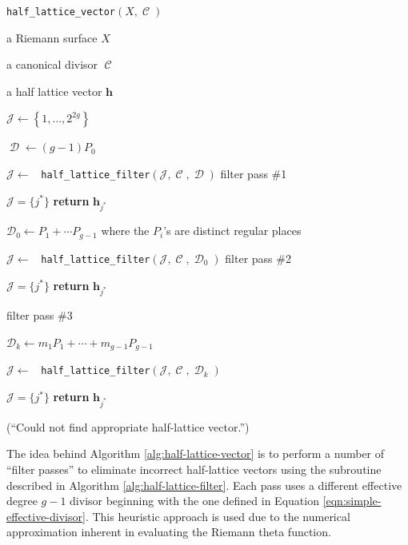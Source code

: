 \documentclass[12pt]{article}
\theoremstyle{definition}
\DeclareMathOperator{\DivC}{\mathcal{C}}
\DeclareMathOperator{\DivD}{\mathcal{D}}
\begin{document}
\begin{algorithm}[t]
\caption{{\tt half\_lattice\_vector}$(X,\DivC)$}
\label{alg:half-lattice-vector}
\begin{algorithmic}[1]

\Require a Riemann surface $X$

\Require a canonical divisor $\DivC$

\Ensure a half lattice vector $\boldsymbol{h}$

\State $\mathcal{J} \gets \left\{ 1, \ldots, 2^{2g} \right\}$

\State $\DivD \gets (g-1)P_0$

\State $\mathcal{J} \gets$ {\tt
  half\_lattice\_filter}$(\mathcal{J},\DivC,\DivD)$ \Comment filter pass \#1

 $\mathcal{J} = \{j^*\}$ {\bf return} $\boldsymbol{h}_{j^*}$

\State $\mathcal{D}_0 \gets P_1 + \cdots P_{g-1}$ where the $P_i$'s are
distinct regular places

\State $\mathcal{J} \gets$ {\tt
  half\_lattice\_filter}$(\mathcal{J},\DivC,\DivD_0)$ \Comment filter pass \#2

 $\mathcal{J} = \{j^*\}$ {\bf return} $\boldsymbol{h}_{j^*}$

 \Comment filter pass \#3

    \State $\mathcal{D}_k \gets m_1P_1 + \cdots + m_{g-1}P_{g-1}$

    \State $\mathcal{J} \gets$ {\tt
      half\_lattice\_filter}$(\mathcal{J},\DivC,\DivD_k)$

     $\mathcal{J} = \{j^*\}$ {\bf return}
    $\boldsymbol{h}_{j^*}$

\EndFor


(``Could not find appropriate half-lattice vector.'')


\end{algorithmic}
\end{algorithm}



The idea behind Algorithm \ref{alg:half-lattice-vector} is to perform a
number of ``filter passes'' to eliminate incorrect half-lattice vectors
using the subroutine described in Algorithm
\ref{alg:half-lattice-filter}. Each pass uses a different effective
degree $g-1$ divisor beginning with the one defined in Equation
\eqref{eqn:simple-effective-divisor}. This heuristic approach is used
due to the numerical approximation inherent in evaluating the Riemann
theta function.
\end{document}
